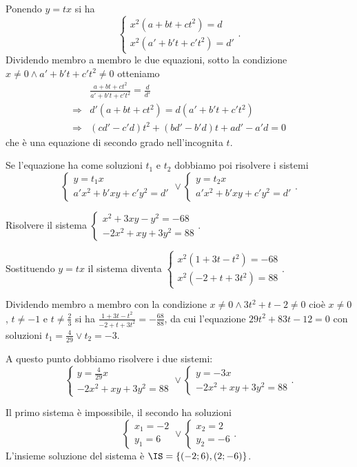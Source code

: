Ponendo $y=tx$ si ha 
\[\left\{\begin{array}{l}{x^2(a+{bt}+{ct}^2)=d}\\{x^2(a'+b't+c't^2)=d'}\end{array}\right..\]
Dividendo membro a membro le due equazioni, sotto la condizione $x\neq 0\wedge a'+b't+c't^2\neq 0$ otteniamo 
\begin{align*}
&\frac{a+{bt}+{ct}^2}{a'+b't+c't^2}=\frac d{d'}\\
\Rightarrow & d'(a+{bt}+{ct}^2)=d(a'+b't+c't^2)\\
\Rightarrow & ({cd}'-c'd)t^2+({bd}'-b'd)t+{ad}'-a'd=0 
\end{align*}
che è una equazione di secondo grado nell'incognita $t$.

Se l'equazione ha come soluzioni $t_1$ e $t_2$ dobbiamo poi risolvere i sistemi \[ \left\{\begin{array}{l}y=t_1x \\a'x^2+b'{xy}+c'y^2=d' \end{array}\right.\vee\left\{\begin{array}{l}y=t_2x \\a'x^2+b'{xy}+c'y^2=d' \end{array}\right.. \]
\newpage
\begin{exrig}
\begin{esempio}
Risolvere il sistema $\left\{\begin{array}{l}x^2+3{xy}-y^2=-68 \\-2x^2+{xy}+3y^2=88 \end{array}\right.$.

Sostituendo $y={tx}$ il sistema diventa $\left\{\begin{array}{l}x^2(1+3t-t^2)=-68 \\x^2(-2+t+3t^2)=88 \end{array}\right.$.

Dividendo membro a membro con la condizione $x\neq 0\wedge 3t^2+t-2\neq 0$ cioè $x\neq 0$, $t\neq -1$ e $t\neq \frac 2 3$ si ha $\frac{1+3t-t^2}{-2+t+3t^2}=-\frac{68}{88}$, da cui l'equazione $29t^2+83t-12=0$ con soluzioni $t_1=\frac 4{29}\vee t_2=-3$.

A questo punto dobbiamo risolvere i due sistemi:\[ \left\{\begin{array}{l}y=\frac 4{29}x \\-2x^2+{xy}+3y^2=88 \end{array}\right.\vee\left\{\begin{array}{l}y=-3x \\-2x^2+{xy}+3y^2=88 \end{array}\right.. \]

Il primo sistema è impossibile, il secondo ha soluzioni 
\[\left\{\begin{array}{l}x_1=-2\\y_1=6\end{array}\right.\vee\left\{\begin{array}{l}x_2=2\\y_2=-6\end{array}\right..\] 
L'insieme soluzione del sistema è $\IS=\{(-2;6),(2;-6)\}$.
\end{esempio}
\end{exrig}

